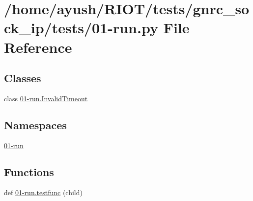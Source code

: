 \hypertarget{gnrc__sock__ip_2tests_201-run_8py}{}\section{/home/ayush/\+R\+I\+O\+T/tests/gnrc\+\_\+sock\+\_\+ip/tests/01-\/run.py File Reference}
\label{gnrc__sock__ip_2tests_201-run_8py}
\subsection*{Classes}
\begin{DoxyCompactItemize}
\item 
class \hyperlink{class01-run_1_1InvalidTimeout}{01-\/run.\+Invalid\+Timeout}
\end{DoxyCompactItemize}
\subsection*{Namespaces}
\begin{DoxyCompactItemize}
\item 
 \hyperlink{namespace01-run}{01-\/run}
\end{DoxyCompactItemize}
\subsection*{Functions}
\begin{DoxyCompactItemize}
\item 
def \hyperlink{namespace01-run_aff983ffd4ab0e6bf8e7e58970e4a10bb}{01-\/run.\+testfunc} (child)
\end{DoxyCompactItemize}
